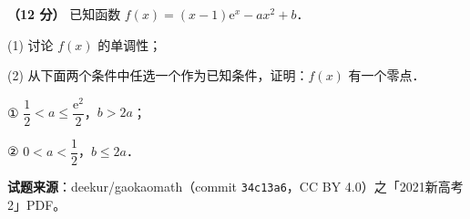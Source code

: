 \begin{question}
\textbf{（12 分）} 已知函数 $f(x)=(x-1)\mathrm e^{x}-ax^{2}+b$．

  (1) 讨论 $f(x)$ 的单调性；

  (2) 从下面两个条件中任选一个作为已知条件，证明：$f(x)$ 有一个零点．

  ① $\dfrac12<a\le\dfrac{\mathrm e^{2}}2$，$b>2a$；

  ② $0<a<\dfrac12$，$b\le2a$．

\par\medskip

\begin{gktip}
\textbf{试题来源}：deekur/gaokaomath（commit \texttt{34c13a6}，CC BY 4.0）之「2021新高考2」PDF。
\end{gktip}

\end{question}